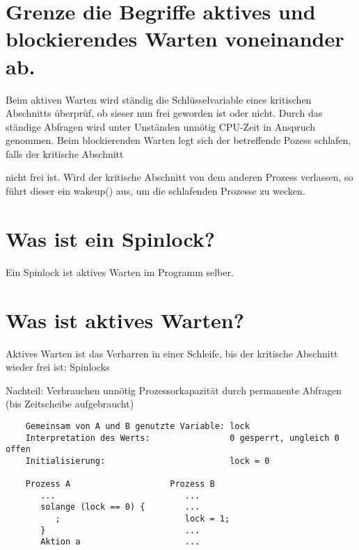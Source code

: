 \documentclass[12pt,a4paper,ngerman]{scrartcl}
\newcommand{\question}[1]{#1}
\newenvironment {answer}
                {}
                {}
\begin{document}
\section{\question{Grenze die Begriffe aktives und blockierendes Warten voneinander ab.}}
\begin{answer}
Beim aktiven Warten wird ständig die Schlüsselvariable eines kritischen Abschnitts überprüf, ob sieser nun frei geworden ist oder nicht. Durch das ständige Abfragen wird unter Unständen unnötig CPU-Zeit in Anspruch genommen.
Beim blockierenden Warten legt sich der betreffende Pozess schlafen, falls der kritische Abschnitt

nicht frei ist. Wird der kritische Abschnitt von dem anderen Prozess verlassen, so führt dieser ein
wakeup() aus, um die schlafenden Prozesse zu wecken.
\end{answer}

\section{\question{Was ist ein Spinlock?}}
\begin{answer}
Ein Spinlock ist aktives Warten im Programm selber.
\end{answer}

\section{\question{Was ist aktives Warten?}}
\begin{answer}
Aktives Warten ist das Verharren in einer Schleife, bis der kritische Abschnitt wieder frei ist: Spinlocks

Nachteil: Verbrauchen unnötig Prozessorkapazität durch permanente Abfragen (bis Zeitscheibe aufgebraucht)

\begin{verbatim}
    Gemeinsam von A und B genutzte Variable: lock
    Interpretation des Werts:                0 gesperrt, ungleich 0 offen 
    Initialisierung:                         lock = 0
           
    Prozess A                    Prozess B
       ...                          ...
       solange (lock == 0) {        ...
          ;                         lock = 1;
       }                            ...
       Aktion a                     ...
\end{verbatim}
\end{answer}
\end{document}
